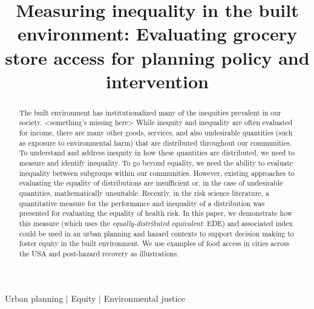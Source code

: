 \documentclass[final,3p,times,onecolumn,sort&compress]{elsarticle}
\begin{document}
\begin{frontmatter}

\title{Measuring inequality in the built environment: Evaluating grocery store access for planning policy and intervention}



\begin{abstract}
The built environment has institutionalized many of the inequities prevalent in our society.
<something's missing here>
While inequity and inequality are often evaluated for income, there are many other goods, services, and also undesirable quantities (such as exposure to environmental harm) that are distributed throughout our communities.
To understand and address inequity in how these quantities are distributed, we need to measure and identify inequality.
To go beyond equality, we need the ability to evaluate inequality between subgroups within our communities.
However, existing approaches to evaluating the equality of distributions are insufficient or, in the case of undesirable quantities, mathematically unsuitable.
Recently, in the risk science literature, a quantitative measure for the performance and inequality of a distribution was presented for evaluating the equality of health risk.
In this paper, we demonstrate how this measure (which uses the \textit{equally-distributed equivalent}: EDE) and associated index could be used in an urban planning and hazard contexts to support decision making to foster equity in the built environment.
We use examples of food access in cities across the USA and post-hazard recovery as illustrations.
\end{abstract}

\begin{keyword}
Urban planning $|$ Equity $|$ Environmental justice 

\end{keyword}

\end{frontmatter}

\end{document}
